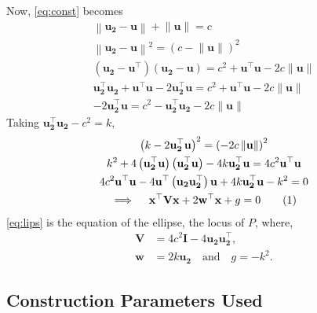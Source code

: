 \documentclass[journal,12pt,twocolumn]{IEEEtran}
\let\vec\mathbf
\providecommand{\brak}[1]{\ensuremath{\left(#1\right)}}
\providecommand{\norm}[1]{\left\lVert#1\right\rVert}
\newcommand\numberthis{\addtocounter{equation}{1}\tag{\theequation}}
\begin{document}
Now, \eqref{eq:const} becomes 
\begin{gather*}
	\norm{\vec{u_2-u}}+\norm{\vec{u}} = c\\
	\norm{\vec{u_2-u}}^2 = \brak{c-\norm{\vec{u}}}^2 \\
	\brak{\vec{{u_2-u}^{\top}}}\brak{\vec{u_2-u}} = c^2 + \vec{u^{\top}}\vec{u} -2c\norm{\vec{u}} \\
	\vec{u_2^{\top}}\vec{u_2} + \vec{u^{\top}}\vec{u} - 2\vec{u_2^{\top}}\vec{u} = c^2 + \vec{u^{\top}}\vec{u} -2c\norm{\vec{u}} \\
	- 2\vec{u_2^{\top}}\vec{u} = c^2 - \vec{u_2^{\top}}\vec{u_2} - 2c\norm{\vec{u}} 
\end{gather*}
Taking $\vec{u_2^{\top}}\vec{u_2} - c^2 = k$, %
\begin{gather*}
	\brak{k - 2\vec{u_2^{\top}}\vec{u}}^2 =  \brak{-2c\norm{\vec{u}}}^2 \\
	k^2 + 4\brak{\vec{u_2^{\top}}\vec{u}}\brak{\vec{u_2^{\top}}\vec{u}} - 4k\vec{u_2^{\top}}\vec{u} =  4c^2\vec{u^{\top}}\vec{u} \\
	4c^2\vec{u^{\top}}\vec{u} - 4\vec{u^{\top}}\brak{\vec{u_2}\vec{u_2^{\top}}}\vec{u} + 4k\vec{u_2^{\top}}\vec{u} - k^2 =  0 \\
		\implies \quad \vec{x^{\top}}\vec{V}\vec{x} + 2\vec{w^{\top}}\vec{x} + g = 0 \numberthis \label{eq:lips}\\
\end{gather*} 
\eqref{eq:lips} is the equation of the ellipse, the locus of $P$, where,
\begin{align*}
	\vec{V} &= 4c^2\vec{I} - 4\vec{u_2}\vec{u_2^{\top}} \text{,}\\
	\vec{w} &= 2k\vec{u_2} \quad \text{and} \quad g = -k^2 \text{.}
\end{align*}

\subsection*{\textbf{Construction Parameters Used}}
\end{document}
